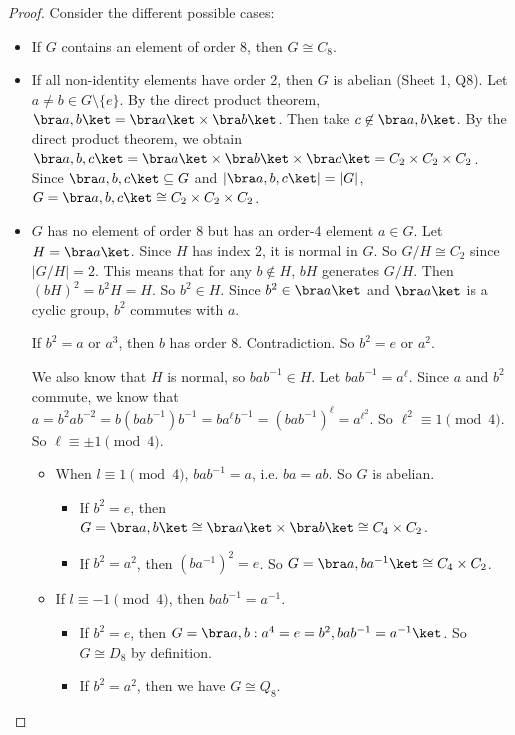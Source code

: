 \documentclass[a4paper]{article}
\begin{document}
  \begin{proof}
    Consider the different possible cases:
    \begin{itemize}
      \item If $G$ contains an element of order 8, then $G\cong C_8$.
      \item If all non-identity elements have order 2, then $G$ is abelian (Sheet 1, Q8). Let $a\not= b\in G\setminus\{e\}$. By the direct product theorem, $\bra a, b\ket = \bra a\ket\times\bra b\ket$. Then take $c\not\in \bra a, b\ket$. By the direct product theorem, we obtain $\bra a, b, c\ket = \bra a\ket\times\bra b\ket\times\bra c\ket = C_2\times C_2\times C_2$. Since $\bra a, b, c\ket\subseteq G$ and $|\bra a, b, c\ket| = |G|$, $G = \bra a, b, c\ket \cong C_2\times C_2\times C_2$.
      \item $G$ has no element of order 8 but has an order-4 element $a\in G$. Let $H = \bra a\ket$. Since $H$ has index 2, it is normal in $G$. So $G/H \cong C_2$ since $|G/H| = 2$. This means that for any $b\not\in H$, $bH$ generates $G/H$. Then $(bH)^2 = b^2H = H$. So $b^2\in H$. Since $b^2\in \bra a\ket$ and $\bra a\ket$ is a cyclic group, $b^2$ commutes with $a$.

        If $b^2 = a$ or $a^3$, then $b$ has order 8. Contradiction. So $b^2 = e$ or $a^2$.

        We also know that $H$ is normal, so $bab^{-1}\in H$. Let $bab^{-1} = a^\ell$. Since $a$ and $b^2$ commute, we know that $a = b^2 ab^{-2}  = b(bab^{-1})b^{-1} = ba^\ell b^{-1} = (bab^{-1})^{\ell} = a^{\ell^2}$. So $\ell^2 \equiv 1\pmod 4$. So $\ell \equiv \pm 1 \pmod 4$.

        \begin{itemize}
          \item When $l\equiv 1\pmod 4$, $bab^{-1} = a$, i.e. $ba = ab$. So $G$ is abelian.
            \begin{itemize}
              \item  If $b^2 = e$, then $G = \bra a, b\ket \cong \bra a\ket \times \bra b\ket \cong C_4\times C_2$.
              \item If $b^2 = a^2$, then $(ba^{-1})^2 = e$. So $G = \bra a, ba^{-1}\ket \cong C_4\times C_2$.
            \end{itemize}
          \item If $l \equiv -1\pmod 4$, then $bab^{-1} = a^{-1}$. 
            \begin{itemize}
              \item If $b^2 = e$, then $G = \bra a, b: a^4 = e = b^2, bab^{-1} = a^{-1}\ket$. So $G\cong D_8$ by definition.
              \item If $b^2 = a^2$, then we have $G\cong Q_8$. 
            \end{itemize}
        \end{itemize}
    \end{itemize}
  \end{proof}
\end{document}
